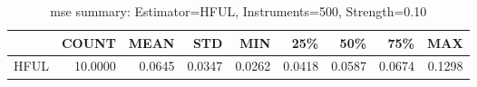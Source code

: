 \begin{table}[ht]
\centering
\caption{mse summary: Estimator=HFUL, Instruments=500, Strength=0.10}
\begin{tabular}{lrrrrrrrr}
\toprule
 & COUNT & MEAN & STD & MIN & 25\% & 50\% & 75\% & MAX \\
\midrule
HFUL & 10.0000 & 0.0645 & 0.0347 & 0.0262 & 0.0418 & 0.0587 & 0.0674 & 0.1298 \\
\bottomrule
\end{tabular}
\end{table}
